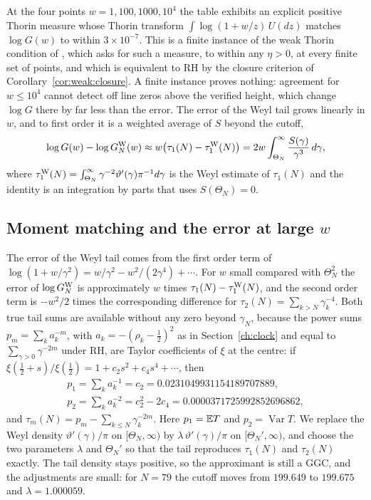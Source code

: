 At the four points $w=1,100,1000,10^4$ the table exhibits an explicit positive Thorin measure whose Thorin transform $\int\log(1+w/z)\,U(dz)$ matches $\log G(w)$ to within $3\times10^{-7}$. This is a finite instance of the weak Thorin condition of \cite[Section 18.2.3]{P26}, which asks for such a measure, to within any $\eta>0$, at every finite set of points, and which is equivalent to RH by the closure criterion of Corollary~\ref{cor:weak:closure}. A finite instance proves nothing: agreement for $w\le10^4$ cannot detect off line zeros above the verified height, which change $\log G$ there by far less than the error. The error of the Weyl tail grows linearly in $w$, and to first order it is a weighted average of $S$ beyond the cutoff,
\[
\log G(w)-\log G_N^{\rm W}(w)\approx w\big(\tau_1(N)-\tau_1^{\rm W}(N)\big)=2w\int_{\Theta_N}^\infty\frac{S(\gamma)}{\gamma^3}\,d\gamma,
\]
where $\tau_1^{\rm W}(N)=\int_{\Theta_N}^\infty\gamma^{-2}\vartheta'(\gamma)\pi^{-1}d\gamma$ is the Weyl estimate of $\tau_1(N)$ and the identity is an integration by parts that uses $S(\Theta_N)=0$.

\subsection{Moment matching and the error at large $w$}\label{sec:ch18:moments}

The error of the Weyl tail comes from the first order term of $\log(1+w/\gamma^2)=w/\gamma^2-w^2/(2\gamma^4)+\cdots$. For $w$ small compared with $\Theta_N^2$ the error of $\log G_N^{\rm W}$ is approximately $w$ times $\tau_1(N)-\tau_1^{\rm W}(N)$, and the second order term is $-w^2/2$ times the corresponding difference for $\tau_2(N)=\sum_{k>N}\gamma_k^{-4}$. Both true tail sums are available without any zero beyond $\gamma_N$, because the power sums $p_m=\sum_ka_k^{-m}$, with $a_k=-(\rho_k-\frac12)^2$ as in Section~\ref{ch:clock} and equal to $\sum_{\gamma>0}\gamma^{-2m}$ under RH, are Taylor coefficients of $\xi$ at the centre: if $\xi(\frac12+s)/\xi(\frac12)=1+c_2s^2+c_4s^4+\cdots$, then
\begin{gather*}
p_1=\sum_ka_k^{-1}=c_2=0.0231049931154189707889,\\
p_2=\sum_ka_k^{-2}=c_2^2-2c_4=0.0000371725992852696862,
\end{gather*}
and $\tau_m(N)=p_m-\sum_{k\le N}\gamma_k^{-2m}$. Here $p_1=\mathbb{E} T$ and $p_2=\operatorname{Var}T$. We replace the Weyl density $\vartheta'(\gamma)/\pi$ on $[\Theta_N,\infty)$ by $\lambda\,\vartheta'(\gamma)/\pi$ on $[\Theta_N',\infty)$, and choose the two parameters $\lambda$ and $\Theta_N'$ so that the tail reproduces $\tau_1(N)$ and $\tau_2(N)$ exactly. The tail density stays positive, so the approximant is still a GGC, and the adjustments are small: for $N=79$ the cutoff moves from $199.649$ to $199.675$ and $\lambda=1.000059$.

